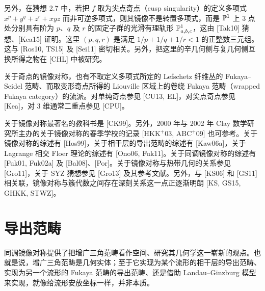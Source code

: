 
另外，在猜想 2.7 中，若把 $f$ 取为尖点奇点（cusp singularity）的定义多项式 $x^p+y^q+z^r+xyz$ 而非可逆多项式，则其镜像不是转置多项式，而是 $\mathbb{P}^1$ 上 3 点处分别具有阶为 $p$、$q$ 及 $r$ 的固定子群的光滑有理轨形 $\mathbb{P}^1_{a,b,c}$，这由 [Tak10] 猜想、[Kea15] 证明。这里 $(p,q,r)$ 是满足 $1/p+1/q+1/r<1$ 的正整数三元组。这与 [Ros10, TS15] 及 [Sei11] 密切相关。另外，把这里的辛几何侧与复几何侧互换所得之物在 [CHL] 中被研究。

关于奇点的镜像对称，也有不取定义多项式所定的 Lefschetz 纤维丛的 Fukaya–Seidel 范畴、而取变形奇点所得的 Liouville 区域上的卷绕 Fukaya 范畴（wrapped Fukaya category）的流派。对单纯奇点参见 [CU13, EL]，对尖点奇点参见 [Kea]，对 3 维通常二重点参见 [CPU]。

关于镜像对称最著名的教科书是 [CK99]。另外，2000 年与 2002 年 Clay 数学研究所主办的关于镜像对称的春季学校的记录 [HKK$^{+}$03, ABC$^{+}$09] 也可参考。关于镜像对称的综述有 [Hos99]，关于相干层的导出范畴的综述有 [Kaw06a]，关于 Lagrange 相交 Floer 理论的综述有 [Ono06, Fuk11]。关于同调镜像对称的综述有 [Fuk01, Fuk02a] 及 [Bal08]、[Por]。关于镜像对称与热带几何的关系参见 [Gro11]，关于 SYZ 猜想参见 [Gro13] 及其参考文献。另外，与 [KS06] 和 [GS11] 相关联，镜像对称与簇代数之间存在深刻关系这一点正逐渐明朗 [KS, GS15, GHKK, STWZ]。

\section{导出范畴}

同调镜像对称提供了把增广三角范畴看作空间、研究其几何学这一崭新的观点。也就是说，增广三角范畴是几何实体；至于它实现为某个流形的相干层的导出范畴、实现为另一个流形的 Fukaya 范畴的导出范畴、还是借助 Landau–Ginzburg 模型来实现，就像给流形安放坐标一样，并非本质。

